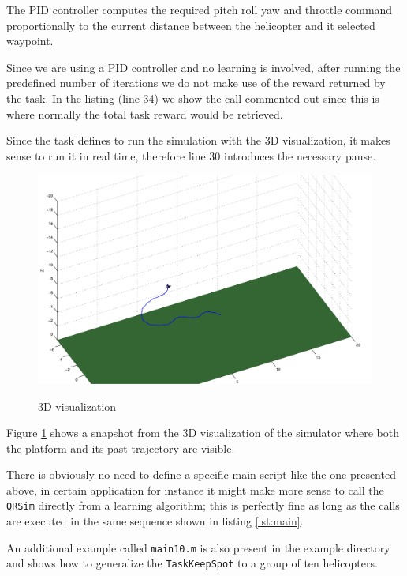 \documentclass[a4paper,11pt]{report}
\newcommand{\snamettt}{\texttt{QRSim}\xspace}
\begin{document}
The PID controller computes the required pitch roll yaw and throttle command proportionally to the current distance between the helicopter and it selected waypoint.

Since we are using a PID controller and no learning is involved, after running the predefined number of iterations we do not make use of the reward returned by the task. In the listing (line 34) we show the call commented out since this is where normally the total task reward would be retrieved.

Since the task defines to run the simulation with the 3D visualization, it makes sense to run it in real time, therefore line 30 introduces the necessary pause.  

\begin{figure}
\begin{center}
\label{fig:3d}
\includegraphics[width=13cm]{fig/3d.jpg}
 \caption{3D visualization}
\end{center}
\end{figure}

Figure \ref{fig:3d} shows a snapshot from the 3D visualization of the simulator where both the platform and its past trajectory are visible.

There is obviously no need to define a specific main script like the one presented above, in certain application for instance it might make more sense to call the \snamettt directly from  a learning algorithm; this is perfectly fine as long as the calls are executed in the same sequence shown in listing \ref{lst:main}.

An additional example called \texttt{main10.m} is also present in the example directory and shows how to generalize the \texttt{TaskKeepSpot} to a group of ten helicopters.
\end{document}
